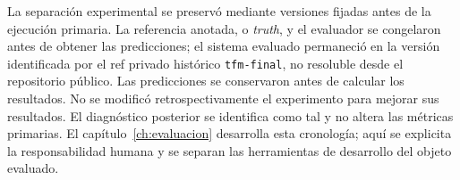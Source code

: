 La separación experimental se preservó mediante versiones fijadas antes de
la ejecución primaria. La referencia anotada, o \emph{truth}, y el evaluador
se congelaron antes de obtener las predicciones; el sistema evaluado permaneció
en la versión identificada por el ref privado histórico
\texttt{tfm-final}, no resoluble desde el repositorio público. Las predicciones se
conservaron antes de calcular los resultados. No se modificó retrospectivamente
el experimento para mejorar sus resultados. El diagnóstico posterior se
identifica como tal y no altera las métricas primarias. El
capítulo~\ref{ch:evaluacion} desarrolla esta cronología; aquí se explicita la
responsabilidad humana y se separan las herramientas de desarrollo del
objeto evaluado.
